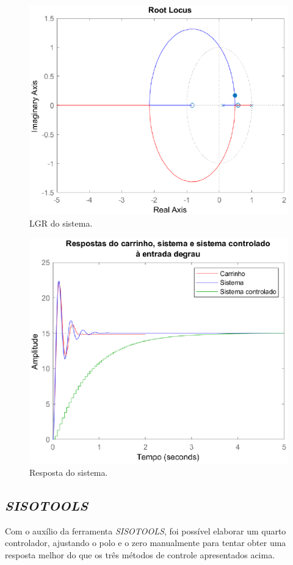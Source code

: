 \documentclass{article}
\begin{document}
\begin{figure}[H]
    \centering
        \includegraphics[width=.8\linewidth]{images/Matlab/identifica_07.eps}
        \caption{LGR do sistema.}\label{fig:lgr_controlador3}
\end{figure}
\begin{figure}[H]
    \centering
        \includegraphics[width=.8\linewidth]{images/Matlab/identifica_08.eps}
        \caption{Resposta do sistema.}\label{fig:resposta_controlador3}
\end{figure}


\subsection{\textit{SISOTOOLS}}

Com o auxílio da ferramenta \textit{SISOTOOLS}, foi possível elaborar um quarto controlador, ajustando o polo e o zero manualmente para tentar obter uma resposta melhor do que os três métodos de controle apresentados acima.
\end{document}
